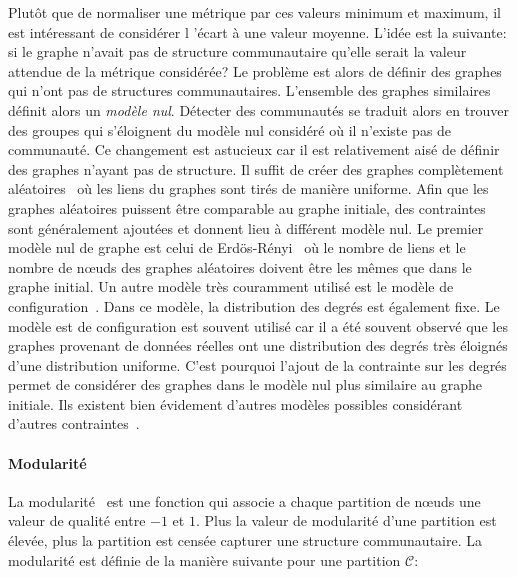 Plutôt que de normaliser une métrique par ces valeurs minimum et maximum, il est intéressant de considérer l 'écart à une valeur moyenne.
L'idée est la suivante: si le graphe n'avait pas de structure communautaire qu'elle serait la valeur attendue de la métrique considérée?
Le problème est alors de définir des graphes qui n'ont pas de structures communautaires.
L'ensemble des graphes similaires définit alors un \emph{modèle nul}.
Détecter des communautés se traduit alors en trouver des groupes qui s'éloignent du modèle nul considéré où il n'existe pas de communauté.
Ce changement est astucieux car il est relativement aisé de définir des graphes n'ayant pas de structure.
Il suffit de créer des graphes complètement aléatoires~\cite{Erdos1959} où les liens du graphes sont tirés de manière uniforme.
Afin que les graphes aléatoires puissent être comparable au graphe initiale, des contraintes sont généralement ajoutées et donnent lieu à différent modèle nul.
Le premier modèle nul de graphe est celui de Erdös-Rényi~\cite{Erdos1959} où le nombre de liens et le nombre de n\oe uds des graphes aléatoires doivent être les mêmes que dans le graphe initial.
Un autre modèle très couramment utilisé est le modèle de configuration~\cite{Bender1978a}.
Dans ce modèle, la distribution des degrés est également fixe.
Le modèle est de configuration est souvent utilisé car il a été souvent observé que les graphes provenant de données réelles ont une distribution des degrés très éloignés d'une distribution uniforme.
C'est pourquoi l'ajout de la contrainte sur les degrés permet de considérer des graphes dans le modèle nul plus similaire au graphe initiale. 
Ils existent bien évidement d'autres modèles possibles considérant d'autres contraintes~\cite{Newman2009}.

\paragraph{Modularité}
La modularité~\cite{Newman2004} est une fonction qui associe a chaque partition de n\oe uds une valeur de qualité entre $-1$ et $1$.
Plus la valeur de modularité d'une partition est élevée, plus la partition est censée capturer une structure communautaire.
La modularité est définie de la manière suivante pour une partition $\mathcal{C}$:

